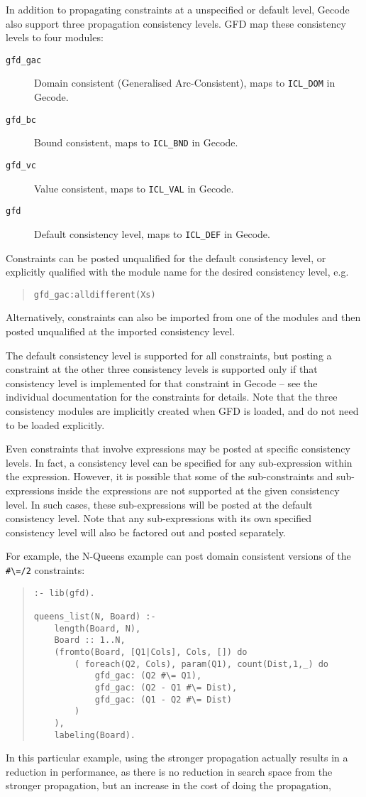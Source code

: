 \label{conlev}
In addition to propagating constraints at a unspecified or default level,
Gecode also support three propagation consistency levels. GFD map
these consistency levels to four modules:
\begin{description}
\item[{\tt gfd_gac}] Domain consistent (Generalised Arc-Consistent), maps to {\tt ICL_DOM} in Gecode.
\item[{\tt gfd_bc}] Bound consistent, maps to {\tt ICL_BND} in Gecode.
\item[{\tt gfd_vc}] Value consistent, maps to {\tt ICL_VAL} in Gecode.
\item[{\tt gfd}] Default consistency level, maps to {\tt ICL_DEF} in Gecode.
\end{description}
Constraints can be posted unqualified for the default consistency level, or
explicitly qualified with the module name for the desired 
consistency level, e.g.
\begin{quote}
\begin{verbatim}
gfd_gac:alldifferent(Xs)
\end{verbatim}
\end{quote}
Alternatively, constraints can also be imported from one of the modules and 
then posted unqualified at the imported consistency level.

The default consistency level is supported for all constraints, but
posting a constraint at the other three consistency levels is supported only
if that consistency level is implemented for that constraint
in Gecode -- see the individual documentation for the constraints for details.
Note that the three consistency modules are implicitly created when GFD
is loaded, and do not need to be loaded explicitly. 

Even constraints that involve expressions may be posted at specific 
consistency levels. In fact, a consistency level can be specified for
any sub-expression within the expression. However, it is possible that some of
the sub-constraints and sub-expressions inside the expressions are not 
supported at the given consistency level. In such cases, these sub-expressions 
will be posted at the default consistency level. Note that any 
sub-expressions with its own specified consistency level will also be 
factored out and posted separately. 

For example, the N-Queens example
can post domain consistent versions of the \verb'#\=/2' constraints:
\begin{quote}
\begin{verbatim}
:- lib(gfd).

queens_list(N, Board) :-
    length(Board, N),
    Board :: 1..N,
    (fromto(Board, [Q1|Cols], Cols, []) do
        ( foreach(Q2, Cols), param(Q1), count(Dist,1,_) do
            gfd_gac: (Q2 #\= Q1),
            gfd_gac: (Q2 - Q1 #\= Dist),
            gfd_gac: (Q1 - Q2 #\= Dist)
        )
    ),
    labeling(Board).
\end{verbatim}
\end{quote}
In this particular example, using the stronger propagation actually results in
a reduction in performance, as there is no reduction in search space from the
stronger propagation, but an increase in the cost of doing the propagation, 

